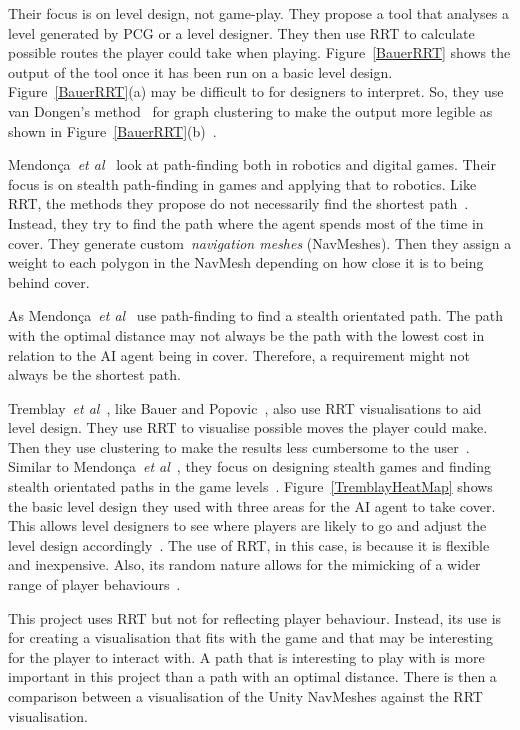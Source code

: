 \documentclass[journal]{IEEEtran}
\begin{document}
	Their focus is on level design, not game-play. They propose a tool that analyses a level generated by PCG or a level designer. They then use RRT to calculate possible routes the player could take when playing.  Figure~\ref{BauerRRT} shows the output of the tool once it has been run on a basic level design.  Figure~\ref{BauerRRT}(a)  may be difficult to for designers to interpret. So, they use van Dongen's method~\cite{Dongen2001} for graph clustering to make the output more legible as shown in Figure~\ref{BauerRRT}(b)~\cite{bauer2012}.  
	
	Mendonça~\textit{et al}~\cite{Mendonça2015} look at path-finding both in robotics and digital games. Their focus is on stealth path-finding in games and applying that to robotics. Like RRT, the methods they propose do not necessarily find the shortest path~\cite{karaman2010, Mendonça2015}. Instead, they try to find the path where the agent spends most of the time in cover. They generate custom~\textit{navigation meshes} (NavMeshes). Then they assign a weight to each polygon in the NavMesh depending on how close it is to being behind cover. 
	
	As Mendonça~\textit{et al}~\cite{Mendonça2015} use path-finding to find a stealth orientated path. The path with the optimal distance may not always be the path with the lowest cost in relation to the AI agent being in cover. Therefore, a requirement might not always be the shortest path. 
	
	Tremblay~\textit{et al}~\cite{Tremblay2013}, like Bauer and Popovic~\cite{bauer2012}, also use RRT visualisations to aid level design. They use RRT to visualise possible moves the player could make. Then they use clustering to make the results less cumbersome to the user~\cite{Tremblay2013}. Similar to Mendonça~\textit{et al}~\cite{Mendonça2015}, they focus on designing stealth games and finding stealth orientated paths in the game levels~\cite{Tremblay2013}.   Figure~\ref{TremblayHeatMap} shows the basic level design they used with three areas for the AI agent to take cover. This allows level designers to see where players are likely to go and adjust the level design accordingly~\cite{Tremblay2013}.  The use of RRT, in this case, is because it is flexible and inexpensive. Also, its random nature allows for the mimicking of a wider range of player behaviours~\cite{Tremblay2013}. 
	
	This project uses RRT but not for reflecting player behaviour.  Instead, its use is for creating a visualisation that fits with the game and that may be interesting for the player to interact with. A path that is interesting to play with is more important in this project than a path with an optimal distance. There is then a comparison between a visualisation of the Unity NavMeshes against the RRT visualisation.
	
\end{document}
